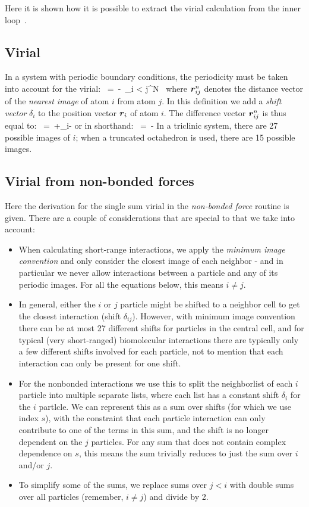 Here it is shown how it is possible to extract the virial calculation
from the inner loop~\cite{Bekker93b}.

\subsection{Virial}
In a system with periodic boundary conditions, the
periodicity must be taken into account for the virial:
\beq
\Xi~=~-\half~\sum_{i < j}^{N}~\rnij\otimes\Fvij
\eeq
where $\rnij$ denotes the distance vector of the
{\em nearest image} of atom $i$ from atom $j$. In this definition we add
a {\em shift vector} $\delta_i$ to the position vector $\rvi$ 
of atom $i$. The difference vector $\rnij$ is thus equal to:
\beq
\rnij~=~\rvi+\delta_i-\rvj
\eeq
or in shorthand:
\beq
\rnij~=~\rni-\rvj
\eeq
In a triclinic system, there are 27 possible images of $i$; when a truncated 
octahedron is used, there are 15 possible images.

\subsection{Virial from non-bonded forces}
Here the derivation for the single sum virial in the {\em non-bonded force} 
routine is given. There are a couple of considerations that are special
to {\gromacs} that we take into account:
\begin{itemize}
\item When calculating short-range interactions, we apply the 
{\em minimum image convention} and only consider the closest 
image of each neighbor - and in particular we never allow interactions
between a particle and any of its periodic images. For all the 
equations below, this means $i \neq j$.
\item In general, either the $i$ or $j$ particle might be shifted to a neighbor
cell to get the closest interaction (shift $\delta_{ij}$). However, with minimum image
convention there can be at most 27 different shifts for particles in the central cell,
and for typical (very short-ranged) biomolecular interactions there are typically only a few
different shifts involved for each particle, not to mention that each interaction can
only be present for one shift. 
\item For the {\gromacs} nonbonded interactions
we use this to split the neighborlist of each $i$ particle into multiple 
separate lists, where each list has a constant shift $\delta_i$ for the $i$ partlcle. We
can represent this as a sum over shifts (for which we use index $s$), with the constraint that
each particle interaction can only contribute to one of the terms in this sum, and the
shift is no longer dependent on the $j$ particles. For any sum that does not contain
complex dependence on $s$, this means the sum trivially reduces to just the sum
over $i$ and/or $j$.
\item To simplify some of the sums, we replace sums over $j<i$ with double sums over
all particles (remember, $i \neq j$) and divide by 2.
\end{itemize}

